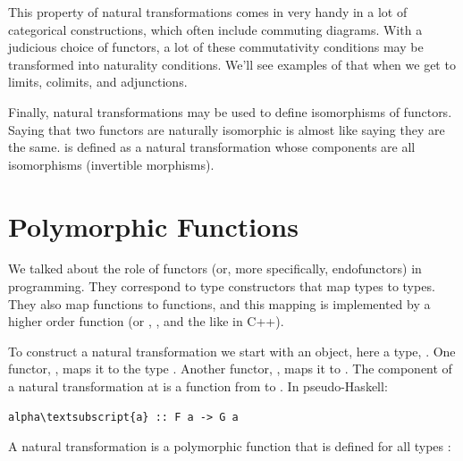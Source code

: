 \begin{figure}[H]
\centering
{}
\end{figure}

\noindent
This property of natural transformations comes in very handy in a lot of
categorical constructions, which often include commuting diagrams. With
a judicious choice of functors, a lot of these commutativity conditions
may be transformed into naturality conditions. We'll see examples of
that when we get to limits, colimits, and adjunctions.

Finally, natural transformations may be used to define isomorphisms of
functors. Saying that two functors are naturally isomorphic is almost
like saying they are the same.  is defined as
a natural transformation whose components are all isomorphisms
(invertible morphisms).

\section{Polymorphic Functions}\label{polymorphic-functions}

We talked about the role of functors (or, more specifically,
endofunctors) in programming. They correspond to type constructors that
map types to types. They also map functions to functions, and this
mapping is implemented by a higher order function  (or
, , and the like in C++).

To construct a natural transformation we start with an object, here a
type, . One functor, , maps it to the type
. Another functor, , maps it to .
The component of a natural transformation  at 
is a function from  to . In pseudo-Haskell:

\begin{Verbatim}[commandchars=\\\{\}]
alpha\textsubscript{a} :: F a -> G a
\end{Verbatim}
A natural transformation is a polymorphic function that is defined for
all types :

